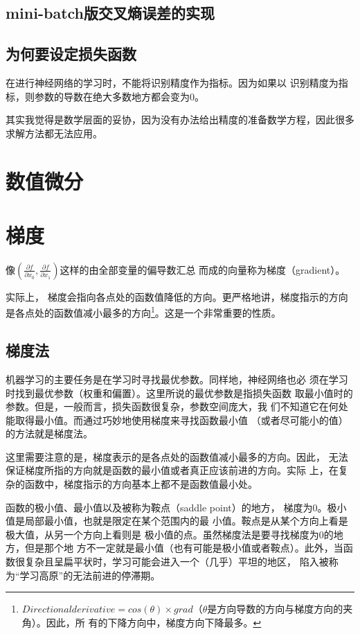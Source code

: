 \subsection{mini-batch版交叉熵误差的实现}

\subsection{为何要设定损失函数}
\begin{tcolorbox}
    在进行神经网络的学习时，不能将识别精度作为指标。因为如果以
    识别精度为指标，则参数的导数在绝大多数地方都会变为0。
\end{tcolorbox}

其实我觉得是数学层面的妥协，因为没有办法给出精度的准备数学方程，因此很多求解方法都无法应用。

\section{数值微分}
\section{梯度}
像$\left(\frac{\partial f}{\partial x_0}, \frac{\partial f}{\partial x_1}\right)$这样的由全部变量的偏导数汇总
而成的向量称为梯度（gradient）。


实际上，
梯度会指向各点处的函数值降低的方向。更严格地讲，梯度指示的方向
是各点处的函数值减小最多的方向\footnote{$Directional derivative= cos(\theta) \times grad$（$\theta$是方向导数的方向与梯度方向的夹角）。因此，所
    有的下降方向中，梯度方向下降最多。}。这是一个非常重要的性质。

\subsection{梯度法}
机器学习的主要任务是在学习时寻找最优参数。同样地，神经网络也必
须在学习时找到最优参数（权重和偏置）。这里所说的最优参数是指损失函数
取最小值时的参数。但是，一般而言，损失函数很复杂，参数空间庞大，我
们不知道它在何处能取得最小值。而通过巧妙地使用梯度来寻找函数最小值
（或者尽可能小的值）的方法就是梯度法。

这里需要注意的是，梯度表示的是各点处的函数值减小最多的方向。因此，
无法保证梯度所指的方向就是函数的最小值或者真正应该前进的方向。实际
上，在复杂的函数中，梯度指示的方向基本上都不是函数值最小处。

\begin{tcolorbox}
    函数的极小值、最小值以及被称为鞍点（saddle point）的地方，
    梯度为0。极小值是局部最小值，也就是限定在某个范围内的最
    小值。鞍点是从某个方向上看是极大值，从另一个方向上看则是
    极小值的点。虽然梯度法是要寻找梯度为0的地方，但是那个地
    方不一定就是最小值（也有可能是极小值或者鞍点）。此外，当函
    数很复杂且呈扁平状时，学习可能会进入一个（几乎）平坦的地区，
    陷入被称为“学习高原”的无法前进的停滞期。
\end{tcolorbox}

